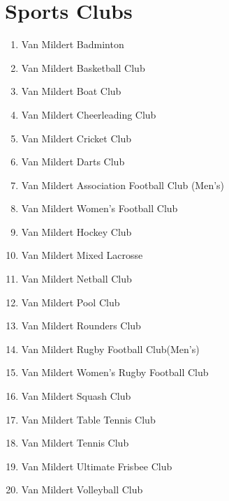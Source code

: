 \documentclass[12pt]{article}  %
\begin{document}
\section{Sports Clubs}
\begin{enumerate}[]
    \item Van Mildert Badminton
    \item Van Mildert Basketball Club
    \item Van Mildert Boat Club
    \item Van Mildert Cheerleading Club
    \item Van Mildert Cricket Club
    \item Van Mildert Darts Club
    \item Van Mildert Association Football Club (Men's)
    \item Van Mildert Women's Football Club
    \item Van Mildert Hockey Club
    \item Van Mildert Mixed Lacrosse
    \item Van Mildert Netball Club
    \item Van Mildert Pool Club
    \item Van Mildert Rounders Club
    \item Van Mildert Rugby Football Club(Men's)
    \item Van Mildert Women's Rugby Football Club
    \item Van Mildert Squash Club
    \item Van Mildert Table Tennis Club
    \item Van Mildert Tennis Club
    \item Van Mildert Ultimate Frisbee Club
    \item Van Mildert Volleyball Club
\end{enumerate}
\end{document}
